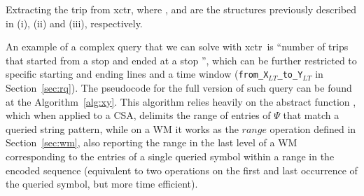 	\begin{algorithm}[ht]
     
     
     \caption{Extracting the trip  from \acrshort{xctr}, where ,  and  are the structures previously described in (i), (ii) and (iii), respectively.}
     \label{alg:extract}
    \end{algorithm}
    
    An example of a complex query that we can solve with \gls{xctr}~is ``number of trips that started from a stop  and ended at a stop '', which can be further restricted to specific starting and ending lines and a time window (\texttt{from\_X$_{LT}$\_to\_Y$_{LT}$} in Section~\ref{sec:rq}). The pseudocode for the full version of such query can be found at the Algorithm~\ref{alg:xy}. This algorithm relies heavily on the abstract function , which when applied to a CSA, delimits the range of entries of $\Psi$ that match a queried string pattern, while on a WM it works as the $range$ operation defined in Section~\ref{sec:wm}, also reporting the range in the last level of a WM corresponding to the entries of a single queried symbol within a range in the encoded sequence (equivalent to two  operations on the first and last occurrence of the queried symbol, but more time efficient).
    
